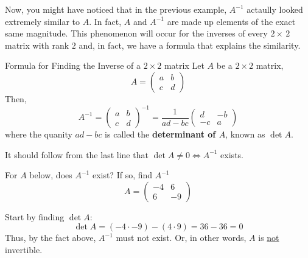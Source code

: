 Now, you might have noticed that in the previous example, $A^{-1}$ actaully looked extremely similar to $A$. In fact, $A$ and $A^{-1}$ are made up elements of the exact same magnitude. This phenomenon will occur for the inverses of every $2\times\,2$ matrix with rank $2$ and, in fact, we have a formula that explains the similarity. 

\begin{impbox}{Formula for Finding the Inverse of a $2 \times 2$ matrix}{}{\label{2.2:formula}}
    Let $A$ be a $2 \times 2$ matrix, 
    \[A = \begin{pmatrix}
        a & b \\ c & d
    \end{pmatrix}\]
    Then, 
    \[
        A^{-1} = \begin{pmatrix}
            a & b \\ c & d
        \end{pmatrix}^{-1}
        = 
        \frac{1}{ad - bc}\begin{pmatrix}
            d & -b \\
            -c & a
        \end{pmatrix}
    \]
    where the quanity $ad-bc$ is called the \textbf{determinant of $A$}, known as $\det{A}$.
\end{impbox}
It should follow from the last line that $\det{A} \neq 0 \Leftrightarrow A^{-1}$ exists.

\begin{example}{}{}
    For $A$ below, does $A^{-1}$ exist? If so, find $A^{-1}$
    \[A = \begin{pmatrix}
        -4 & 6 \\ 6 & -9
    \end{pmatrix}\] 
    \begin{solution}
        Start by finding $\det{A}$: 
        \[
            \det{A} = \left(-4 \cdot -9\right) - \left(4 \cdot 9\right) = 36 - 36 = 0
        \]
        Thus, by the fact above, $A^{-1}$ must not exist. Or, in other words, $A$ is \underline{not} invertible.
    \end{solution}
\end{example}

